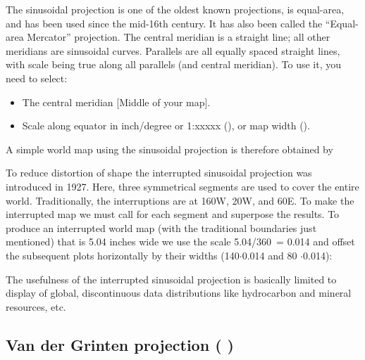 The sinusoidal projection is one of the oldest known
projections, is equal-area, and has been used since the
mid-16th century.  It has also been called the
``Equal-area Mercator'' projection. The central meridian
is a straight line; all other meridians are sinusoidal
curves.  Parallels are all equally spaced straight lines,
with scale being true along all parallels (and central
meridian).  To use it, you need to select:

\begin{itemize} 
\item The central meridian [Middle of your map].
\item Scale along equator in inch/degree or 1:xxxxx (), or map width ().
\end{itemize} 

A simple world map using the sinusoidal projection is therefore obtained by


To reduce distortion of shape the interrupted sinusoidal
projection was introduced in 1927.  Here, three symmetrical
segments are used to cover the entire world.  Traditionally,
the interruptions are at 160\DS W, 20\DS W, and 60\DS E.
To make the interrupted map we must call  for
each segment and superpose the results.  To produce an
interrupted world map (with the traditional boundaries
just mentioned) that is 5.04 inches wide we use the scale
5.04/360\DS\ = 0.014 and offset the subsequent plots
horizontally by their widths (140\DS $\cdot$0.014 and 80\DS
$\cdot$0.014): 



The usefulness of the interrupted sinusoidal projection is
basically limited to display of global, discontinuous data
distributions like hydrocarbon and mineral resources, etc.


\subsection{Van der Grinten projection ( )}

